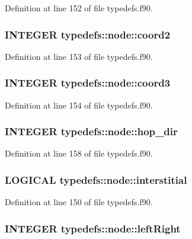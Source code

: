 Definition at line 152 of file typedefs.f90.\hypertarget{typetypedefs_1_1node_a193df4b6034deaefb550227844eb14e8}{
\subsubsection[{coord2}]{\setlength{\rightskip}{0pt plus 5cm}INTEGER {\bf typedefs::node::coord2}}}
\label{typetypedefs_1_1node_a193df4b6034deaefb550227844eb14e8}


Definition at line 153 of file typedefs.f90.\hypertarget{typetypedefs_1_1node_a549fd6fc277071807eae3dbf96072b2d}{
\subsubsection[{coord3}]{\setlength{\rightskip}{0pt plus 5cm}INTEGER {\bf typedefs::node::coord3}}}
\label{typetypedefs_1_1node_a549fd6fc277071807eae3dbf96072b2d}


Definition at line 154 of file typedefs.f90.\hypertarget{typetypedefs_1_1node_a6449a053fa7b845ec185aa8beab922ad}{
\subsubsection[{hop\_\-dir}]{\setlength{\rightskip}{0pt plus 5cm}INTEGER {\bf typedefs::node::hop\_\-dir}}}
\label{typetypedefs_1_1node_a6449a053fa7b845ec185aa8beab922ad}


Definition at line 158 of file typedefs.f90.\hypertarget{typetypedefs_1_1node_a0cb4076931485d693d3f2a06268d99fb}{
\subsubsection[{interstitial}]{\setlength{\rightskip}{0pt plus 5cm}LOGICAL {\bf typedefs::node::interstitial}}}
\label{typetypedefs_1_1node_a0cb4076931485d693d3f2a06268d99fb}


Definition at line 150 of file typedefs.f90.\hypertarget{typetypedefs_1_1node_a8f68bb360020b240c621a72a7119256d}{
\subsubsection[{leftRight}]{\setlength{\rightskip}{0pt plus 5cm}INTEGER {\bf typedefs::node::leftRight}}}
\label{typetypedefs_1_1node_a8f68bb360020b240c621a72a7119256d}


